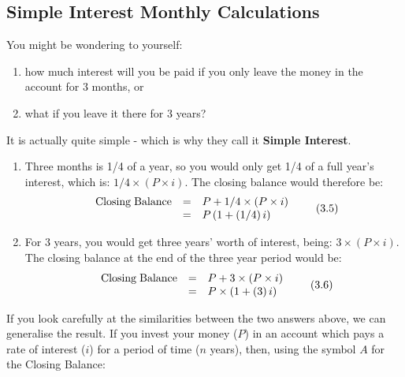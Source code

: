             \subsection{ Simple Interest Monthly Calculations}
            \nopagebreak
        \label{m39332*id69658}You might be wondering to yourself:\par 
        \label{m39332*id69662}\begin{enumerate}[noitemsep, label=\textbf{\arabic*}. ] 
            \label{m39332*uid30}\item how much interest will you be paid if you only leave the money in the account for 3 months, or
\label{m39332*uid31}\item what if you leave it there for 3 years?
\end{enumerate}
        \label{m39332*id69691}
It is actually quite simple - which is why they call it \textbf{Simple Interest}.\par 
        \label{m39332*id69703}\begin{enumerate}[noitemsep, label=\textbf{\arabic*}. ] 
            \label{m39332*uid32}\item Three months is 1/4 of a year, so you would only get 1/4 of a full year's interest, which is: $1/4\ensuremath{\times}\left(P\ensuremath{\times}i\right)$. The closing balance would therefore be:
\label{m39332*id69748}\nopagebreak\noindent{}
    \begin{equation}
    \begin{array}{ccc}\hfill \mathrm{Closing\; Balance}& =& P+1/4\ensuremath{\times}\left(P\ensuremath{\times}i\right)\hfill \\ & =& P\left(1+\left(1/4\right)i\right)\hfill \end{array}\tag{3.5}
      \end{equation}
    \label{m39332*uid33}\item For 3 years, you would get three years' worth of interest, being: $3\ensuremath{\times}\left(P\ensuremath{\times}i\right)$. The closing balance at the end of the three year period would be:
\label{m39332*id69871}\nopagebreak\noindent{}
    \begin{equation}
    \begin{array}{ccc}\hfill \mathrm{Closing\; Balance}& =& P+3\ensuremath{\times}\left(P\ensuremath{\times}i\right)\hfill \\ & =& P\ensuremath{\times}\left(1+\left(3\right)i\right)\hfill \end{array}\tag{3.6}
      \end{equation}
    \end{enumerate}
        \label{m39332*id69952}If you look carefully at the similarities between the two answers above, we can generalise the result. If you invest your money ($P$) in an account which pays a rate of interest ($i$) for a period of time ($n$ years), then, using the symbol $A$ for the Closing Balance:\par 
        \label{m39332*uid34}\nopagebreak\noindent{}
          
